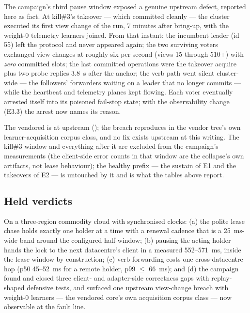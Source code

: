 The campaign's third pause window exposed a genuine upstream defect,
reported here as fact. At kill\#3's takeover --- which committed
cleanly --- the cluster executed its first view change of the run, 7
minutes after bring-up, with the weight-0 telemetry learners joined.
From that instant: the incumbent leader (id 55) left the protocol and
never appeared again; the two surviving voters exchanged view changes
at roughly six per second (views 15 through 510+) with \emph{zero}
committed slots; the last committed operations were the takeover
acquire plus two probe replies 3.8~s after the anchor; the verb path
went silent cluster-wide --- the followers' forwarders waiting on a
leader that no longer commits --- while the heartbeat and telemetry
planes kept flowing. Each voter eventually arrested itself into its
poisoned fail-stop state; with the observability change (E3.3) the
arrest now names its reason.

The vendored  is at upstream 
(); the breach reproduces in the vendor tree's own
learner-acquisition corpus class, and no fix exists upstream at this
writing. The kill\#3 window and everything after it are excluded from
the campaign's measurements (the client-side error counts in that
window are the collapse's own artifacts, not lease behaviour); the
healthy prefix --- the sustain of E1 and the takeovers of E2 --- is
untouched by it and is what the tables above report.

\subsection{Held verdicts}

On a three-region commodity cloud with synchronised clocks: (a) the
polite lease chase holds exactly one holder at a time with a renewal
cadence that is a 25~ms-wide band around the configured half-window;
(b) pausing the acting holder hands the lock to the next datacentre's
client in a measured 552--571~ms, inside the lease window by
construction; (c) verb forwarding costs one cross-datacentre hop
(p50 45--52~ms for a remote holder, p99 $\le$ 66~ms); and (d) the
campaign found and closed three client- and adapter-side correctness
gaps with replay-shaped defensive tests, and surfaced one upstream
view-change breach with weight-0 learners --- the vendored core's
own acquisition corpus class --- now observable at the fault line.
